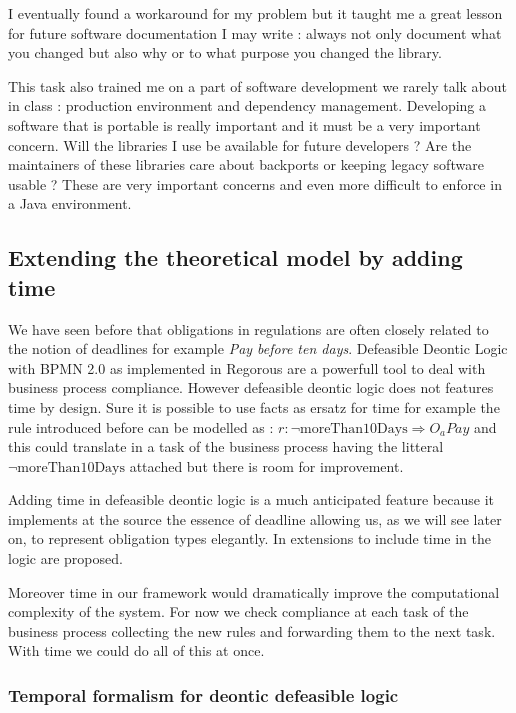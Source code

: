 \documentclass[10pt]{report}
\begin{document}
I eventually found a workaround for my problem but it taught me a great lesson for future software documentation I may write : always not only document what you changed but also why or to what purpose you changed the library.

This task also trained me on a part of software development we rarely talk about in class : production environment and dependency management. Developing a software that is portable is really important and it must be a very important concern. Will the libraries I use be available for future developers ? Are the maintainers of these libraries care about backports or keeping legacy software usable ?
These are very important concerns and even more difficult to enforce in a Java environment. %


\subsection{Extending the theoretical model by adding time}

We have seen before that obligations in regulations are often closely related to the notion of deadlines for example \textit{Pay before ten days}. Defeasible Deontic Logic with BPMN 2.0 as implemented in Regorous are a powerfull tool to deal with business process compliance. However defeasible deontic logic does not features time by design. Sure it is possible to use facts as ersatz for time for example the rule introduced before can be modelled as : $r: \neg \text{moreThan10Days} \Rightarrow O_{a}Pay$ and this could translate in a task of the business process having the litteral $ \neg \text{moreThan10Days}$ attached but there is room for improvement.

Adding time in defeasible deontic logic is a much anticipated feature because it implements at the source the essence of deadline allowing us, as we will see later on, to represent obligation types elegantly. In \autocite{TemporalExtension2007} extensions to include time in the logic are proposed.

Moreover time in our framework would dramatically improve the computational complexity of the system. For now we check compliance at each task of the business process collecting the new rules and forwarding them to the next task. With time we could do all of this at once. %

\subsubsection{Temporal formalism for deontic defeasible logic}
\end{document}
